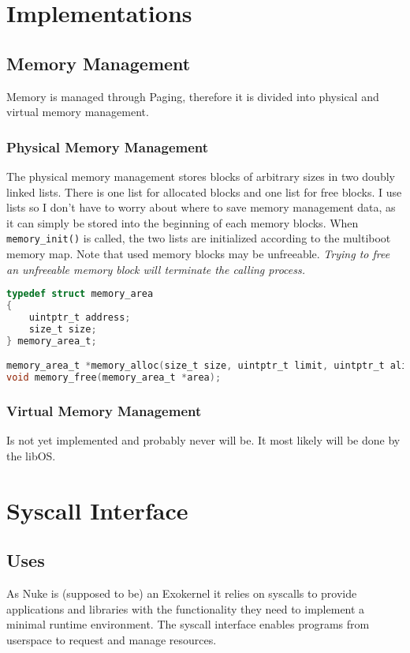 \documentclass[a4paper,openany]{scrbook}
\begin{document}
\part{Implementations}
\chapter{Memory Management}
Memory is managed through Paging, therefore it is divided into physical
and virtual memory management.
\section{Physical Memory Management}
The physical memory management stores blocks of arbitrary sizes
in two doubly linked lists. There is one list for allocated blocks
and one list for free blocks. I use lists so I don't have to worry about
where to save memory management data, as it can simply be stored into the
beginning of each memory blocks. When \texttt{memory\_init()} is called, the
two lists are initialized according to the multiboot memory map. Note that
used memory blocks may be unfreeable. \emph{Trying to free an unfreeable
memory block will terminate the calling process.}

\begin{lstlisting}[basicstyle={\ttfamily},breaklines=true,language=C,numbers=right]
typedef struct memory_area
{
    uintptr_t address;
    size_t size;
} memory_area_t;

memory_area_t *memory_alloc(size_t size, uintptr_t limit, uintptr_t align);
void memory_free(memory_area_t *area);
\end{lstlisting}
\section{Virtual Memory Management}
Is not yet implemented and probably never will be. It most likely will be
done by the libOS.
\part{Syscall Interface}
\chapter{Uses}
As Nuke is (supposed to be) an Exokernel it relies on syscalls to
provide applications and libraries with the functionality they need
to implement a minimal runtime environment. The syscall interface
enables programs from userspace to request and manage resources.
\end{document}

